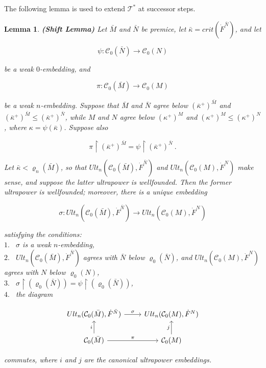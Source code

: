\documentclass[12pt]{article}
\newtheorem{lem}[thm]{Lemma}
\begin{document}
The following lemma is used to extend $\mathscr{T}^*$ at successor steps.\\

\begin{lem} \textbf{(Shift Lemma)}
Let $\bar{M}$ and $\bar{N}$ be premice, let $\bar{\kappa} = crit (\dot{F}^{\bar{N}})$, and let

\[
\psi: \mathcal{C}_0 (\bar{N}) \longrightarrow \mathcal{C}_0 (N)
\]

be a weak $0$-embedding, and

\[
\pi : \mathcal{C}_0 (\bar{M}) \longrightarrow \mathcal{C}_0 (M)
\]

be a weak $n$-embedding.  Suppose that $\bar{M}$ and $\bar{N}$ agree below $( \bar{\kappa}^+ )^{\bar{M}}$ and $( \bar{\kappa}^+ )^{\bar{M}} \leq ( \bar{\kappa}^+ )^{\bar{N}}$, while $M$ and $N$ agree below $( \kappa^+)^{M}$ and $(\kappa^+)^M \leq ( \kappa^+ )^N$, where $\kappa = \psi (\bar{\kappa} )$.  Suppose also

\[
\pi \restriction (\bar{\kappa}^+ )^{\bar{M}} = \psi \restriction (\bar{\kappa}^+ )^{\bar{N}} \ .
\]

Let $\bar{\kappa} < \varrho_n (\bar{M})$, so that $Ult_n (\mathcal{C}_0 (\bar{M}) , \dot{F}^{\bar{N}} )$ and $Ult_n (\mathcal{C}_0 (M) , \dot{F}^{N} )$ make sense, and suppose the latter ultrapower is wellfounded.  Then the former ultrapower is wellfounded; moreover, there is a unique embedding 

\[
\sigma: Ult_n (\mathcal{C}_0 (\bar{M}) , \dot{F}^{\bar{N}}) \longrightarrow Ult_n (\mathcal{C}_0 (M) , \dot{F}^{N} )
\]

satisfying the conditions:\\

\indent $1.$ \ $\sigma$ is a weak $n$-embedding,\\

\indent $2.$ \ $Ult_n (\mathcal{C}_0 (\bar{M}) , \dot{F}^{\bar{N}})$ agrees with $\bar{N}$ below $\varrho_0 (\bar{N})$, and $Ult_n ( \mathcal{C}_0 (M) , \dot{F}^{N} )$ agrees with $N$ below $\varrho_0 (N)$,\\

\indent $3.$ \ $\sigma \restriction ( \varrho_0 (\bar{N})) = \psi \restriction ( \varrho_0 (\bar{N}))$,\\

\indent $4.$ \ the diagram

\[
\begin{tikzcd}
Ult_n (\mathcal{C}_0 (\bar{M}), \dot{F}^{\bar{N}} )
\arrow[r, "\sigma"]
& Ult_n (\mathcal{C}_0 (M), \dot{F}^N )\\
\mathcal{C}_0 (\bar{M})
\arrow[u, "i"]
\arrow[r, "\pi"]
& \mathcal{C}_0 (M) \arrow[u, "j"]
\end{tikzcd}
\]


commutes, where $i$ and $j$ are the canonical ultrapower embeddings.
\end{lem}
\end{document}
